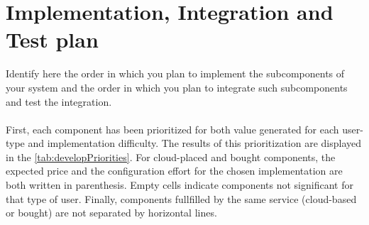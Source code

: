 \documentclass{article}
\begin{document}
\section{Implementation, Integration and Test plan}	Identify 	here	the	order	in	which	you	plan	
to	implement	the	subcomponents	of	your	system	and	the	order	in	which	you	plan	to	integrate	
such	subcomponents	and	test	the	integration.	\\\\
First, each component has been prioritized for both value generated for each user-type and implementation difficulty. The results of this prioritization are displayed in the \cref{tab:developPriorities}. For cloud-placed and bought components, the expected price and the configuration effort for the chosen implementation are both written in parenthesis. Empty cells indicate components not significant for that type of user. Finally, components fullfilled by the same service (cloud-based or bought) are not separated by horizontal lines.
\end{document}
